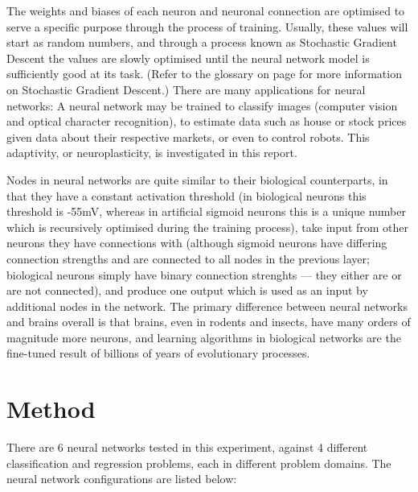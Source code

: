 \documentclass[]{report}
\begin{document}
The weights and biases of each neuron and neuronal connection are optimised to serve a specific purpose through the process of training. Usually, these values will start as random numbers, and through a process known as Stochastic Gradient Descent the values are slowly optimised until the neural network model is sufficiently good at its task. (Refer to the glossary on page \pageref{itm:SGD} for more information on Stochastic Gradient Descent.) There are many applications for neural networks: A neural network may be trained to classify images (computer vision and optical character recognition), to estimate data such as house or stock prices given data about their respective markets, or even to control robots. This adaptivity, or neuroplasticity, is investigated in this report.

Nodes in neural networks are quite similar to their biological counterparts, in that they have a constant activation threshold (in biological neurons this threshold is -55mV, whereas in artificial sigmoid neurons this is a unique number which is recursively optimised during the training process), take input from other neurons they have connections with (although sigmoid neurons have differing connection strengths and are connected to all nodes in the previous layer; biological neurons simply have binary connection strenghts --- they either are or are not connected), and produce one output which is used as an input by additional nodes in the network. The primary difference between neural networks and brains overall is that brains, even in rodents and insects, have many orders of magnitude more neurons, and learning algorithms in biological networks are the fine-tuned result of billions of years of evolutionary processes.

\label{itm:Method}
\section{Method}

There are 6 neural networks tested in this experiment, against 4 different classification and regression problems, each in different problem domains. The neural network configurations are listed below:
\end{document}

